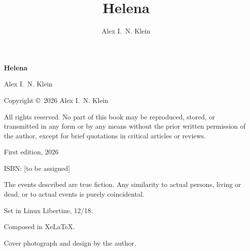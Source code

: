 \documentclass[12pt, twoside, openright]{book}
\title{Helena}
\author{Alex I.~N. Klein}
\date{}
\begin{document}
	\frontmatter
	
	\thispagestyle{empty}
	\begin{center}
		\vspace*{1.5in}
		
		{\Huge\bfseries Helena}
		
		\vspace{1in}
		
		{\Large Alex I.~N. Klein}
		
		\vspace{3in}
		
	\end{center}
	
	\clearpage
	
	\thispagestyle{empty}
	\vspace*{7in}
	
	\begin{center}
		\footnotesize
		
		Copyright \copyright\ 2026 Alex I.~N. Klein
		
		All rights reserved. No part of this book may be reproduced, stored, or transmitted in any form or by any means without the prior written permission of the author, except for brief quotations in critical articles or reviews.

		\vspace{1em}

		First edition, 2026

		ISBN: [to be assigned]

		\vspace{1em}

		The events described are true fiction. Any similarity to actual persons, living or dead, or to actual events is purely coincidental.

		\vspace{1em}

		Set in Linux Libertine, 12/18.

		Composed in Xe\LaTeX.

		Cover photograph and design by the author.
				
	\end{center}
	
	\clearpage
	
	\tableofcontents
	
	\clearpage
	
\end{document}
